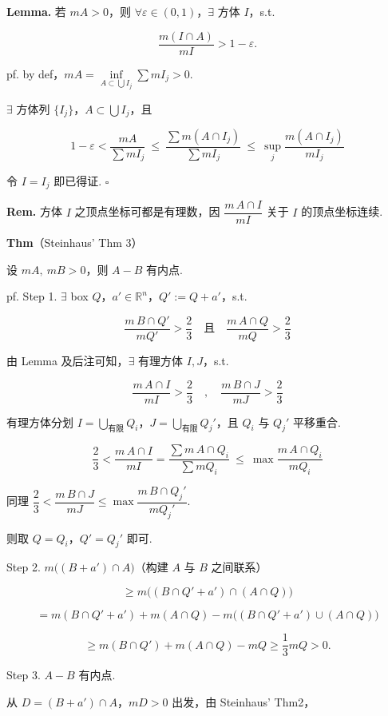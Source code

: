 \documentclass[11pt]{ctexart}
\theoremstyle{definition}
\begin{document}
\textbf{Lemma.} 若 $mA > 0$，则 $\forall \varepsilon \in (0, 1)$，$\exists$ 方体 $I$，s.t.

\[
\frac{m(I \cap A)}{mI} > 1 - \varepsilon.
\]

pf. by def，$mA = \inf\limits_{A \subset \bigcup I_j} \sum mI_j > 0$.

$\exists$ 方体列 $\{I_j\}$，$A \subset \bigcup I_j$，且

\[
1 - \varepsilon < \frac{mA}{\sum mI_j} \ \leq\ \frac{\sum m(A \cap I_j)}{\sum mI_j} \ \leq\ \sup_j \frac{m(A \cap I_j)}{mI_j}
\]

令 $I = I_j$ 即已得证. $\square$

\textbf{Rem.} 方体 $I$ 之顶点坐标可都是有理数，因 $\dfrac{m\, A \cap I}{mI}$ 关于 $I$ 的顶点坐标连续.

\textbf{Thm}（Steinhaus' Thm 3）

设 $mA,\ mB > 0$，则 $A - B$ 有内点.

pf. Step 1. $\exists$ box $Q$，$a' \in \mathbb{R}^n$，$Q' := Q + a'$，s.t.

\[
\frac{m\, B \cap Q'}{mQ'} > \frac{2}{3} \quad \text{且} \quad \frac{m\, A \cap Q}{mQ} > \frac{2}{3}
\]

由 Lemma 及后注可知，$\exists$ 有理方体 $I, J$，s.t.

\[
\frac{m\, A \cap I}{mI} > \frac{2}{3} \quad,\quad \frac{m\, B \cap J}{mJ} > \frac{2}{3}
\]

有理方体分划 $I = \bigcup\limits_{\text{有限}} Q_i$，$J = \bigcup\limits_{\text{有限}} Q_j'$，且 $Q_i$ 与 $Q_j'$ 平移重合.

\[
\frac{2}{3} < \frac{m\, A \cap I}{mI} = \frac{\sum m\, A \cap Q_i}{\sum m Q_i} \ \leq\ \max \frac{m\, A \cap Q_i}{mQ_i}
\]

同理 $\dfrac{2}{3} < \dfrac{m\, B \cap J}{mJ} \leq \max \dfrac{m\, B \cap Q_j'}{m Q_j'}$.

则取 $Q = Q_i$，$Q' = Q_j'$ 即可.

Step 2. $m\big((B + a') \cap A\big)$（构建 $A$ 与 $B$ 之间联系）

\[
\geq m\big((B \cap Q' + a') \cap (A \cap Q)\big)
\]

\[
= m(B \cap Q' + a') + m(A \cap Q) - m\big((B \cap Q' + a') \cup (A \cap Q)\big)
\]

\[
\geq m(B \cap Q') + m(A \cap Q) - mQ \geq \frac{1}{3} mQ > 0.
\]

Step 3. $A - B$ 有内点.

从 $D = (B + a') \cap A$，$mD > 0$ 出发，由 Steinhaus' Thm2，
\end{document}
